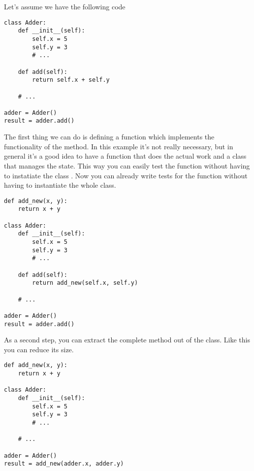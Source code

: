 Let's assume we have the following code

\begin{programcode}{}
\begin{verbatim}
class Adder:
    def __init__(self):
        self.x = 5
        self.y = 3
        # ...

    def add(self):
        return self.x + self.y
    
    # ...

adder = Adder()
result = adder.add()
\end{verbatim}
\end{programcode}

The first thing we can do is defining a function  which implements the functionality of the  method. In this example it's not really necessary, but in general it's a good idea to have a function that does the actual work and a class that manages the state. This way you can easily test the function  without having to instatiate the class . Now you can already write tests for the function without having to instantiate the whole class.

\begin{programcode}{}
\begin{verbatim}
def add_new(x, y):
    return x + y

class Adder:
    def __init__(self):
        self.x = 5
        self.y = 3
        # ...

    def add(self):
        return add_new(self.x, self.y)
    
    # ...

adder = Adder()
result = adder.add()
\end{verbatim}
\end{programcode}

As a second step, you can extract the complete method out of the class. Like this you can reduce its size.

\begin{programcode}{}
\begin{verbatim}
def add_new(x, y):
    return x + y

class Adder:
    def __init__(self):
        self.x = 5
        self.y = 3
        # ...
    
    # ...

adder = Adder()
result = add_new(adder.x, adder.y)
\end{verbatim}
\end{programcode}

